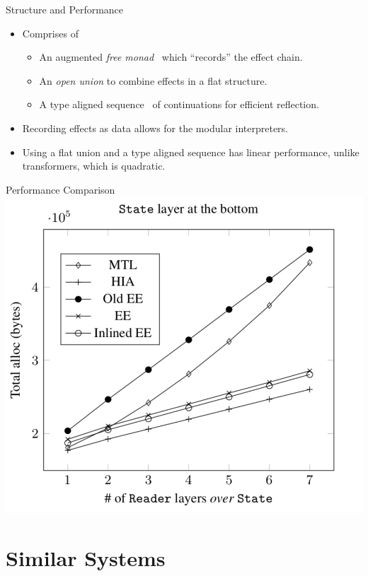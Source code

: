 \documentclass[aspectratio=169]{beamer}
\begin{document}
\begin{frame}{Structure and Performance}
  \begin{itemize}
  \item Comprises of
    \begin{itemize}
    \item An augmented \emph{free monad}~\cite{data-types-a-la-carte} which ``records'' the effect chain.
    \item An \emph{open union} to combine effects in a flat structure.
    \item A type aligned sequence~\cite{ftc-queue} of continuations for efficient reflection.
    \end{itemize}
  \item Recording effects as data allows for the modular interpreters.
    \item Using a flat union and a type aligned sequence has linear performance,
      unlike transformers, which is quadratic.
  \end{itemize}
\end{frame}

\begin{frame}{Performance Comparison}
  \includegraphics[height=0.7\textheight]{freer-performance.png}
  \cite{freer}
\end{frame}

\section{Similar Systems}
\end{document}
